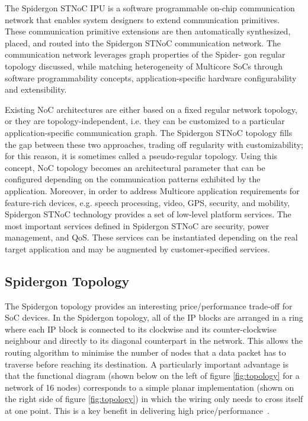 The Spidergon STNoC IPU is a software programmable on-chip communication network that enables system designers to extend communication primitives. 
These communication primitive extensions are then automatically synthesized, placed, and routed into the Spidergon STNoC communication network. 
The communication network leverages graph properties of the Spider- gon regular topology discussed, while matching heterogeneity of Multicore SoCs through software programmability concepts, application-specific hardware configurability and extensibility.

Existing NoC architectures are either based on a fixed regular network topology, or they are topology-independent, i.e. they can be customized to a particular application-specific communication graph. 
The Spidergon STNoC topology fills the gap between these two approaches, trading off regularity with customizability; for this reason, it is sometimes called a pseudo-regular topology\cite{coppola2008design}. 
Using this concept, NoC topology becomes an architectural parameter that can be configured depending on the communication patterns exhibited by the application. 
Moreover, in order to address Multicore application requirements for feature-rich devices, e.g. speech processing, video, GPS, security, and mobility, Spidergon STNoC technology provides a set of low-level platform services. 
The most important services defined in Spidergon STNoC are security, power management, and QoS. 
These services can be instantiated depending on the real target application and may be augmented by customer-specified services.

\subsection{Spidergon Topology}\label{S:topology}

The Spidergon topology provides an interesting price/performance trade-off for SoC devices. 
In the Spidergon topology, all of the IP blocks are arranged in a ring where each IP block is connected to its clockwise and its counter-clockwise neighbour and directly to its diagonal counterpart in the network. 
This allows the routing algorithm to minimise the number of nodes that a data packet has to traverse before reaching its destination. 
A particularly important advantage is that the functional diagram (shown below on the left of figure \ref{fig:topology} for a network of 16 nodes) corresponds to a simple planar implementation (shown on the right side of figure \ref{fig:topology}) in which the wiring only needs to cross itself at one point. This is a key benefit in delivering high price/performance~\cite{STMicroelectronics2005}.

